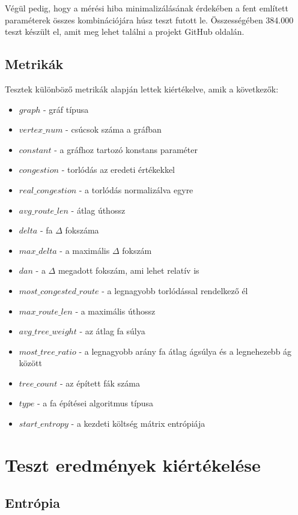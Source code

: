\documentclass[12pt]{report}
\begin{document}
Végül pedig, hogy a mérési hiba minimalizálásának érdekében a fent említett paraméterek összes kombinációjára húsz teszt futott le. 
Összességében 384.000 teszt készült el, amit meg lehet találni a projekt GitHub oldalán.

\section{Metrikák}

Tesztek különböző metrikák alapján lettek kiértékelve, amik a következők:

\begin{itemize}
	\item $graph$ - gráf típusa 
	\item $vertex\_num$ - csúcsok száma a gráfban
	\item $constant$ - a gráfhoz tartozó konstans paraméter 
	\item $congestion$ - torlódás az eredeti értékekkel
	\item $real\_congestion$ - a torlódás normalizálva egyre
	\item $avg\_route\_len$ - átlag úthossz
	\item $delta$ - fa $\Delta$ fokszáma
	\item $max\_delta$ - a maximális $\Delta$ fokszám
	\item $dan$ - a $\Delta$ megadott fokszám, ami lehet relatív is
	\item $most\_congested\_route$ - a legnagyobb torlódással rendelkező él
	\item $max\_route\_len$ - a maximális úthossz
	\item $avg\_tree\_weight$ - az átlag fa súlya
	\item $most\_tree\_ratio$ - a legnagyobb arány fa átlag ágsúlya és a legnehezebb ág között
	\item $tree\_count$ - az épített fák száma
	\item $type$ - a fa építései algoritmus típusa
	\item $start\_entropy$ - a kezdeti költség mátrix entrópiája
\end{itemize}
	

\chapter{Teszt eredmények kiértékelése}

\section{Entrópia}
\end{document}
